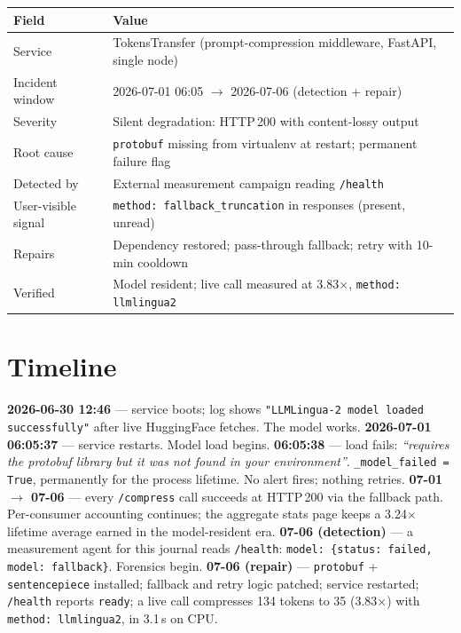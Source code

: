 \documentclass[10pt]{article}
\begin{document}
\begin{center}
\small
\begin{tabular}{ll}
\toprule
\bf Field & \bf Value \\
\midrule
Service & TokensTransfer (prompt-compression middleware, FastAPI, single node) \\
Incident window & 2026-07-01 06:05 $\to$ 2026-07-06 (detection + repair) \\
Severity & Silent degradation: HTTP\,200 with content-lossy output \\
Root cause & \texttt{protobuf} missing from virtualenv at restart; permanent failure flag \\
Detected by & External measurement campaign reading \texttt{/health} \\
User-visible signal & \texttt{method: fallback\_truncation} in responses (present, unread) \\
Repairs & Dependency restored; pass-through fallback; retry with 10-min cooldown \\
Verified & Model resident; live call measured at 3.83$\times$, \texttt{method: llmlingua2} \\
\bottomrule
\end{tabular}
\end{center}

\section{Timeline}
\label{sec:timeline}

\textbf{2026-06-30 12:46} --- service boots; log shows \texttt{"LLMLingua-2 model loaded successfully"} after live HuggingFace fetches. The model works.
\textbf{2026-07-01 06:05:37} --- service restarts. Model load begins.
\textbf{06:05:38} --- load fails: \emph{``requires the protobuf library but it was not found in your environment''}. \texttt{\_model\_failed = True}, permanently for the process lifetime. No alert fires; nothing retries.
\textbf{07-01 $\to$ 07-06} --- every \texttt{/compress} call succeeds at HTTP\,200 via the fallback path. Per-consumer accounting continues; the aggregate stats page keeps a 3.24$\times$ lifetime average earned in the model-resident era.
\textbf{07-06 (detection)} --- a measurement agent for this journal reads \texttt{/health}: \texttt{model: \{status: failed, model: fallback\}}. Forensics begin.
\textbf{07-06 (repair)} --- \texttt{protobuf} + \texttt{sentencepiece} installed; fallback and retry logic patched; service restarted; \texttt{/health} reports \texttt{ready}; a live call compresses 134 tokens to 35 (3.83$\times$) with \texttt{method: llmlingua2}, in 3.1\,s on CPU.
\end{document}
